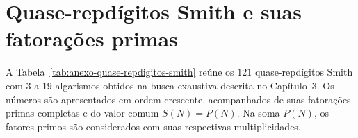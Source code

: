 \documentclass[12pt,a4paper]{report}
\begin{document}
\renewcommand{\tablename}{Tabela}
\renewcommand{\appendixname}{Anexo}
\appendix

\chapter{Quase-repdígitos Smith e suas fatorações primas}
\label{anexo:quase-repdigitos-smith}

A Tabela~\ref{tab:anexo-quase-repdigitos-smith}
reúne os \(121\) quase-repdígitos Smith com
\(3\) a \(19\) algarismos obtidos na busca exaustiva
descrita no Capítulo~3.
Os números são apresentados em ordem crescente,
acompanhados de suas fatorações primas completas
e do valor comum \(S(N)=P(N)\).
Na soma \(P(N)\), os fatores primos são considerados
com suas respectivas multiplicidades.

\begingroup
\small
\setlength{\tabcolsep}{4pt}
\renewcommand{\arraystretch}{1.15}
\end{document}
